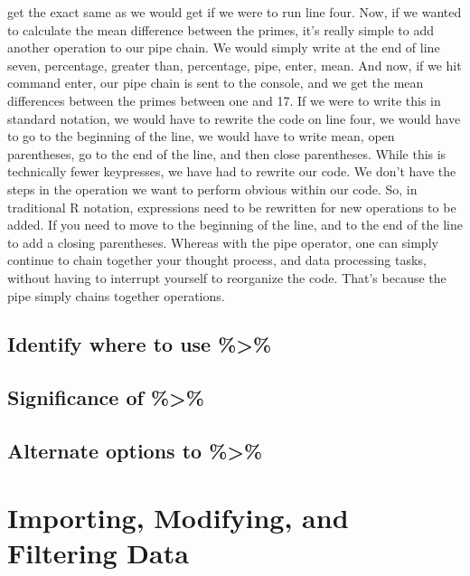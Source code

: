 \documentclass[
]{article}
\begin{document}
get the exact same as we would get if we were to run line four. Now, if we wanted to calculate the mean difference between the primes, it's really simple to add another operation to our pipe chain. We would simply write at the end of line seven, percentage, greater than, percentage, pipe, enter, mean. And now, if we hit command enter, our pipe chain is sent to the console, and we get the mean differences between the primes between one and 17. If we were to write this in standard notation, we would have to rewrite the code on line four, we would have to go to the beginning of the line, we would have to write mean, open parentheses, go to the end of the line, and then close parentheses. While this is technically fewer keypresses, we have had to rewrite our code. We don't have the steps in the operation we want to perform obvious within our code. So, in traditional R notation, expressions need to be rewritten for new operations to be added. If you need to move to the beginning of the line, and to the end of the line to add a closing parentheses. Whereas with the pipe operator, one can simply continue to chain together your thought process, and data processing tasks, without having to interrupt yourself to reorganize the code. That's because the pipe simply chains together operations.

\hypertarget{identify-where-to-use}{%
\subsection{Identify where to use \%\textgreater\%}\label{identify-where-to-use}}

\hypertarget{significance-of}{%
\subsection{Significance of \%\textgreater\%}\label{significance-of}}

\hypertarget{alternate-options-to}{%
\subsection{Alternate options to \%\textgreater\%}\label{alternate-options-to}}

\hypertarget{importing-modifying-and-filtering-data}{%
\section{Importing, Modifying, and Filtering Data}\label{importing-modifying-and-filtering-data}}
\end{document}
